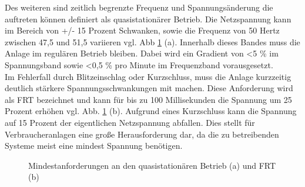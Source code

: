 Des weiteren sind zeitlich begrenzte Frequenz und Spannungsänderung die auftreten können definiert als quasistationärer Betrieb. Die Netzspannung kann im Bereich von +/- 15 Prozent Schwanken, sowie die Frequenz von 50 Hertz zwischen 47,5 und 51,5 variieren vgl. Abb \ref{fig:vde4120-Anforderungen} (a). Innerhalb dieses Bandes muss die Anlage im regulären Betrieb bleiben. Dabei wird ein Gradient von  <5 \%  im Spannungsband sowie <0,5 \% pro Minute im Frequenzband vorausgesetzt. \\
Im Fehlerfall durch Blitzeinschlag oder Kurzschluss, muss die Anlage kurzzeitig deutlich stärkere Spannungsschwankungen mit machen. Diese Anforderung wird als \gls{FRT} bezeichnet und kann für bis zu 100 Millisekunden die Spannung um 25 Prozent erhöhen vgl. Abb. \ref{fig:vde4120-Anforderungen} (b). Aufgrund eines Kurzschluss kann die Spannung auf 15 Prozent der eigentlichen Netzspannung abfallen. Dies stellt für Verbraucheranlagen eine große Herausforderung dar, da die zu betreibenden Systeme meist eine mindest Spannung benötigen.

\begin{figure}[H]
\centering
{}%

\qquad
{}%

\caption[quasistationären Betrieb (a) und \gls{FRT} (b)]{Mindestanforderungen an den quasistationären Betrieb (a) und \gls{FRT} (b)}
\label{fig:vde4120-Anforderungen}
\end{figure}




